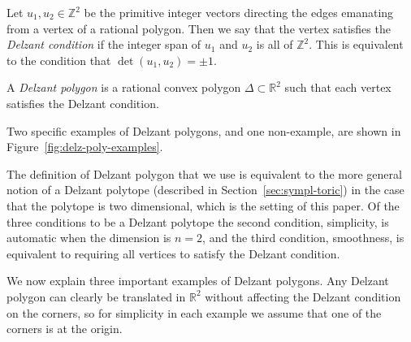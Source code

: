 \documentclass[pdftex]{sigma}
\numberwithin{equation}{section}
\def\R{{\mathbb R}}
\def\Z{{\mathbb Z}}
\newcommand{\De}{\Delta}
\begin{document}
\begin{definition}\label{def:delzant_cond}
Let $u_1,u_2\in\mathbb{Z}^2$ be the primitive integer vectors directing the edges emanating from a vertex of a rational polygon. Then we say that the vertex satisfies the \emph{Delzant condition} if the integer span of $u_1$ and $u_2$ is all of $\Z^2$. This is equivalent to the condition that ${\det (u_1,u_2) = \pm 1}$.
\end{definition}

\begin{Definition}\label{def:delzant} A \emph{Delzant polygon} is a rational convex polygon $\De\subset\R^2$ such that each vertex satisfies the Delzant condition.
\end{Definition}

Two specific examples of Delzant polygons, and one non-example, are shown in Figure~\ref{fig:delz-poly-examples}.


\begin{Remark}
The definition of Delzant polygon that we use is equivalent to the more general notion of a Delzant polytope (described in Section~\ref{sec:sympl-toric}) in the case that the polytope is two dimensional, which is the setting of this paper.
Of the three conditions to be a Delzant polytope the second condition, simplicity, is automatic when the dimension is $n=2$, and the third condition, smoothness, is equivalent to requiring all vertices to satisfy the Delzant condition.
\end{Remark}













We now explain three important examples of Delzant polygons. Any Delzant polygon can clearly be translated in $\R^2$ without affecting the Delzant condition on the corners, so for simplicity in each example we assume that one of the corners is at the origin.
\end{document}
